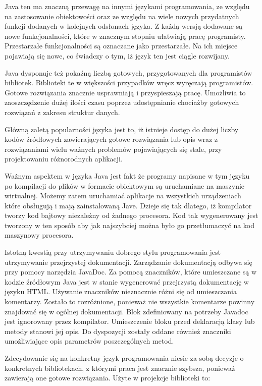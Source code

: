 \cite{horstmann}Java ten ma znaczną przewagę na innymi językami programowania,  ze względu na zastosowanie obiektowości oraz ze względu na wiele nowych przydatnych funkcji dodanych w kolejnych odsłonach języka. Z każdą wersją dodawane są nowe funkcjonalności, które w znacznym stopniu ułatwiają pracę programisty. Przestarzałe funkcjonalności są oznaczane jako przestarzałe. Na ich miejsce pojawiają się nowe, co świadczy o tym, iż język ten jest ciągle rozwijany. 


Java dysponuje też pokaźną liczbą gotowych, przygotowanych dla programistów bibliotek. Biblioteki te w większości przypadków wręcz wyręczają programistów. Gotowe rozwiązania znacznie usprawniają i przyspieszają pracę. Umożliwia to zaoszczędzenie dużej ilości czasu poprzez udostępnianie chociażby gotowych rozwiązań z zakresu struktur danych.


Główną zaletą popularności języka jest to, iż istnieje dostęp do dużej liczby kodów źródłowych zawierających gotowe rozwiązania lub opis wraz z rozwiązaniami wielu ważnych problemów pojawiających się stale, przy projektowaniu różnorodnych aplikacji.


\cite{horstmann2}Ważnym aspektem w języka Java jest fakt że programy napisane w tym języku  po kompilacji do plików w formacie obiektowym są uruchamiane na maszynie wirtualnej. Możemy zatem uruchamiać aplikacje na wszystkich urządzeniach które obsługują i mają zainstalowaną Jave. Dzieje się tak dlatego, iż kompilator tworzy kod bajtowy niezależny od żadnego procesora. Kod tak wygenerowany jest tworzony w ten sposób aby jak najszybciej można było go przetłumaczyć na kod maszynowy procesora.


Istotną kwestią przy utrzymywaniu dobrego stylu programowania jest utrzymywanie przejrzystej dokumentacji. Zarządzanie dokumentacją odbywa się przy pomocy narzędzia JavaDoc. Za pomocą znaczników, które umieszczane są w kodzie źródłowym Java jest w stanie wygenerować przejrzystą dokumentację w języku HTML. Używanie znaczników nieznacznie różni się od umieszczania komentarzy. Zostało to rozróżnione, ponieważ nie wszystkie komentarze powinny znajdować się w ogólnej dokumentacji. Blok zdefiniowany na potrzeby Javadoc jest ignorowany przez kompilator. Umieszczenie bloku przed deklaracją klasy lub metody stanowi jej opis. Do dyspozycji zostały oddane również znaczniki umożliwiające opis parametrów poszczególnych metod. 


Zdecydowanie się na konkretny język programowania niesie za sobą decyzje o konkretnych bibliotekach, z którymi praca jest znacznie szybsza, ponieważ zawierają one gotowe rozwiązania. Użyte w projekcje biblioteki to:


